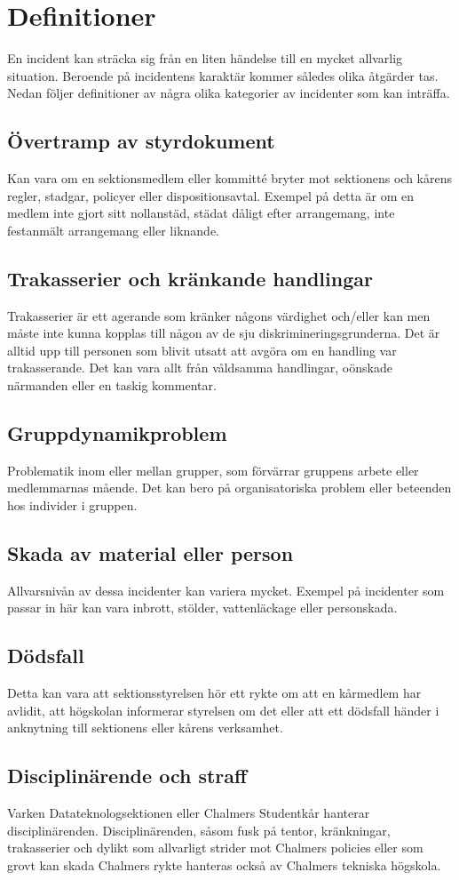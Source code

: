 \section{Definitioner}
En incident kan sträcka sig från en liten händelse till en mycket allvarlig situation. Beroende på incidentens karaktär kommer således olika åtgärder tas. Nedan följer definitioner av några olika kategorier av incidenter som kan inträffa.

\subsection{Övertramp av styrdokument}
Kan vara om en sektionsmedlem eller kommitté bryter mot sektionens och kårens regler, stadgar, policyer eller dispositionsavtal. Exempel på detta är om en medlem inte gjort sitt nollanstäd, städat dåligt efter arrangemang, inte festanmält arrangemang eller liknande.

\subsection{Trakasserier och kränkande handlingar}
Trakasserier är ett agerande som kränker någons värdighet och/eller kan men måste inte kunna kopplas till någon av de sju diskrimineringsgrunderna. Det är alltid upp till personen som blivit utsatt att avgöra om en handling var trakasserande. Det kan vara allt från våldsamma handlingar, oönskade närmanden eller en taskig kommentar. 

\subsection{Gruppdynamikproblem}
Problematik inom eller mellan grupper, som förvärrar gruppens arbete eller medlemmarnas mående. Det kan bero på organisatoriska problem eller beteenden hos individer i gruppen.

\subsection{Skada av material eller person}
Allvarsnivån av dessa incidenter kan variera mycket. Exempel på incidenter som passar in här kan vara inbrott, stölder, vattenläckage eller personskada.

\subsection{Dödsfall}
Detta kan vara att sektionsstyrelsen hör ett rykte om att en kårmedlem har avlidit, att högskolan informerar styrelsen om det eller att ett dödsfall händer i anknytning till sektionens eller kårens verksamhet.

\subsection{Disciplinärende och straff}
Varken Datateknologsektionen eller Chalmers Studentkår hanterar
disciplinärenden. Disciplinärenden, såsom fusk på tentor, kränkningar, trakasserier och dylikt som allvarligt strider mot Chalmers policies eller som
grovt kan skada Chalmers rykte hanteras också av Chalmers tekniska högskola.